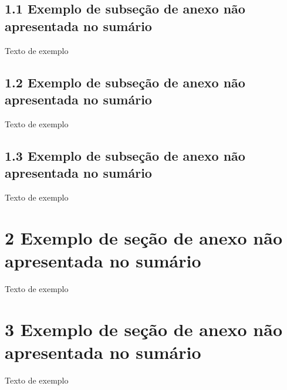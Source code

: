 \documentclass[
	12pt,				%
	oneside,			%
	a4paper,			%
	english,			%
	brazil				%
	]{abntex2ppgsi}
\begin{document}
\begin{anexosenv}
\subsection*{1.1 Exemplo de subseção de anexo não apresentada no sumário}

Texto de exemplo

\subsection*{1.2 Exemplo de subseção de anexo não apresentada no sumário}

Texto de exemplo

\subsection*{1.3 Exemplo de subseção de anexo não apresentada no sumário}

Texto de exemplo

\section*{2 Exemplo de seção de anexo não apresentada no sumário}

Texto de exemplo

\section*{3 Exemplo de seção de anexo não apresentada no sumário}

Texto de exemplo

\end{anexosenv}

\end{document}
